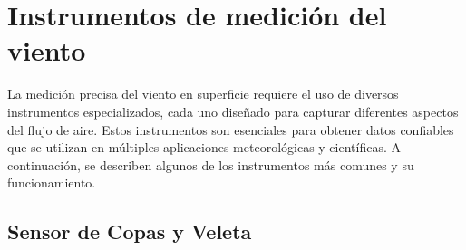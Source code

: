 \section{Instrumentos de medición del viento}\label{sec:instrumentos_med_viento}
La medición precisa del viento en superficie requiere el uso de diversos instrumentos especializados, cada uno diseñado para capturar diferentes aspectos del flujo de aire. Estos instrumentos son esenciales para obtener datos confiables que se utilizan en múltiples aplicaciones meteorológicas y científicas. A continuación, se describen algunos de los instrumentos más comunes y su funcionamiento.

\subsection*{Sensor de Copas y Veleta}

